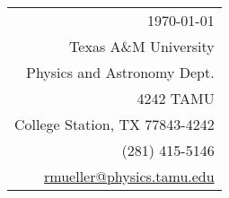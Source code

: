 \documentclass[11pt]{article}
\begin{document}
\hfill%
\begin{tabular}{@{}r@{}}
  \today \\
  [.5em]
Texas A\&M University \\
Physics and Astronomy Dept. \\
4242 TAMU \\
College Station, TX 77843-4242 \\
[.5em]
(281) 415-5146 \\
\href{mailto:rmueller@physics.tamu.edu}{rmueller@physics.tamu.edu}\\
\end{tabular}



\bigskip




\end{document}
